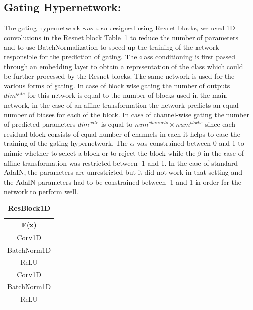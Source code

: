 \documentclass[10pt,twocolumn,letterpaper]{article}
\def\tabref#1{Table~\ref{#1}}
\begin{document}
\subsection{Gating Hypernetwork:}
The gating hypernetwork was also designed using Resnet blocks, we used 1D convolutions in the Resnet block \tabref{table:resblock1D} to reduce the number of parameters and to use BatchNormalization to speed up the training of the network responsible for the prediction of gating. The class conditioning is first passed through an embedding layer to obtain a representation of the class which could be further processed by the Resnet blocks. The same network is used for the various forms of gating. In case of block wise gating the number of outputs $dim^{gate}$ for this network is equal to the number of blocks used in the main network, in the case of an affine transformation the network predicts an equal number of biases for each of the block. In case of channel-wise gating the number of predicted parameters $dim^{gate}$ is equal to $num^{channels}\times num^{blocks}$ since each residual block consists of equal number of channels in each it helps to ease the training of the gating hypernetwork. The $\alpha$ was constrained between 0 and 1 to mimic whether to select a block or to reject the block while the $\beta$ in the case of affine transformation was restricted between -1 and 1. In the case of standard AdaIN, the parameters are unrestricted but it did not work in that setting and the AdaIN parameters had to be constrained between -1 and 1 in order for the network to perform well. 

\begin{table}[ht]
\caption{\textbf{ResBlock1D}} %
\centering %
\begin{tabular}{c} %
\toprule
\textbf{F(x)}\\\midrule
Conv1D\\ %
BatchNorm1D\\
ReLU \\
Conv1D\\
BatchNorm1D\\
ReLU \\
\bottomrule %
\end{tabular}
\label{table:resblock1D} %
\end{table}
\end{document}
